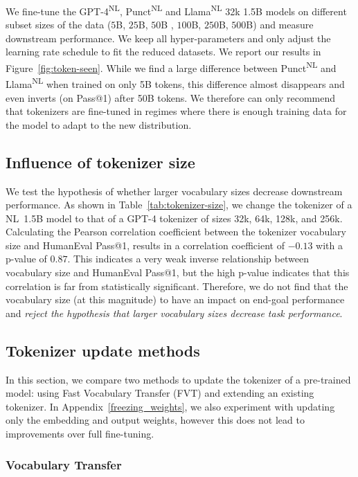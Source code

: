 We fine-tune the GPT-4\textsuperscript{NL}, Punct\textsuperscript{NL} and Llama\textsuperscript{NL} 32k 1.5B models on different subset sizes of the data ($5$B, $25$B, $50$B , $100$B, $250$B, $500$B) and measure downstream performance. We keep all hyper-parameters and only adjust the learning rate schedule to fit the reduced datasets. We report our results in Figure~\ref{fig:token-seen}.
While we find a large difference between Punct\textsuperscript{NL} and Llama\textsuperscript{NL} when trained on only 5B tokens, this difference almost disappears and even inverts (on Pass@1) after 50B tokens. We therefore can only recommend that tokenizers are fine-tuned in regimes where there is enough training data for the model to adapt to the new distribution. 

\subsection{Influence of tokenizer size}
\label{sec:vocab-size-influence}

We test the hypothesis of whether larger vocabulary sizes decrease downstream performance. As shown in Table~\ref{tab:tokenizer-size}, we change the tokenizer of a NL~1.5B model to that of a GPT-4 tokenizer of sizes 32k, 64k, 128k, and 256k. Calculating the Pearson correlation coefficient between the tokenizer vocabulary size and HumanEval Pass@1, results in a correlation coefficient of $-0.13$ with a p-value of $0.87$. This indicates a very weak inverse relationship between vocabulary size and HumanEval Pass@1, but the high p-value indicates that this correlation is far from statistically significant. Therefore, we do not find that the vocabulary size (at this magnitude) to have an impact on end-goal performance and \textit{reject the hypothesis that larger vocabulary sizes decrease task performance}.

\subsection{Tokenizer update methods} In this section, we compare two methods to update the tokenizer of a pre-trained model: using Fast Vocabulary Transfer (FVT) and extending an existing tokenizer. In Appendix~\ref{freezing_weights}, we also experiment with updating only the embedding and output weights, however this does not lead to improvements over full fine-tuning.

\subsubsection{Vocabulary Transfer}

